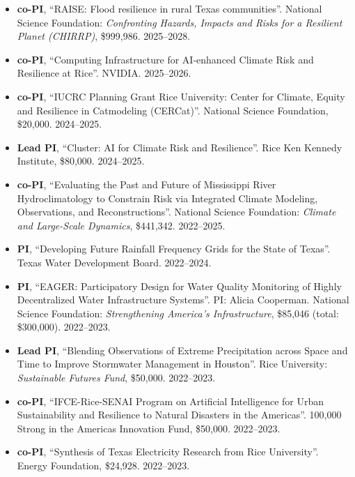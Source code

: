 \documentclass[10pt,oneside]{article}
\begin{document}
\begin{itemize}[label={}]
  
  \item \textbf{co-PI}, \enquote{RAISE: Flood resilience in rural Texas communities}.  National Science Foundation: \textit{Confronting Hazards, Impacts and Risks for a Resilient Planet (CHIRRP)}, \$999,986. 2025--2028.
        
  \item \textbf{co-PI}, \enquote{Computing Infrastructure for AI-enhanced Climate Risk and Resilience at Rice}.  NVIDIA. 2025--2026.
        
  \item \textbf{co-PI}, \enquote{IUCRC Planning Grant Rice University: Center for Climate, Equity and Resilience in Catmodeling (CERCat)}.  National Science Foundation, \$20,000. 2024--2025.
        
  \item \textbf{Lead PI}, \enquote{Cluster: AI for Climate Risk and Resilience}.  Rice Ken Kennedy Institute, \$80,000. 2024--2025.
        
  \item \textbf{co-PI}, \enquote{Evaluating the Past and Future of Mississippi River Hydroclimatology to Constrain Risk via Integrated Climate Modeling, Observations, and Reconstructions}.  National Science Foundation: \textit{Climate and Large-Scale Dynamics}, \$441,342. 2022--2025.
        
  \item \textbf{PI}, \enquote{Developing Future Rainfall Frequency Grids for the State of Texas}.  Texas Water Development Board. 2022--2024.
        
  \item \textbf{PI}, \enquote{EAGER: Participatory Design for Water Quality Monitoring of Highly Decentralized Water Infrastructure Systems}.  PI: Alicia Cooperman. National Science Foundation: \textit{Strengthening America's Infrastructure}, \$85,046 (total: \$300,000). 2022--2023.
        
  \item \textbf{Lead PI}, \enquote{Blending Observations of Extreme Precipitation across Space and Time to Improve Stormwater Management in Houston}.  Rice University: \textit{Sustainable Futures Fund}, \$50,000. 2022--2023.
        
  \item \textbf{co-PI}, \enquote{IFCE-Rice-SENAI Program on Artificial Intelligence for Urban Sustainability and Resilience to Natural Disasters in the Americas}.  100,000 Strong in the Americas Innovation Fund, \$50,000. 2022--2023.
        
  \item \textbf{co-PI}, \enquote{Synthesis of Texas Electricity Research from Rice University}.  Energy Foundation, \$24,928. 2022--2023.
        
\end{itemize}
\end{document}
